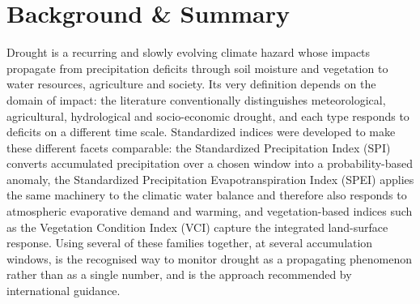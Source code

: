 \documentclass[10pt,a4paper]{article}
\begin{document}
\section*{Background \& Summary}
Drought is a recurring and slowly evolving climate hazard whose impacts propagate from precipitation deficits through soil moisture and vegetation to water resources, agriculture and society. Its very definition depends on the domain of impact: the literature conventionally distinguishes meteorological, agricultural, hydrological and socio-economic drought, and each type responds to deficits on a different time scale\citep{WilhiteGlantz1985,MishraSingh2010}. Standardized indices were developed to make these different facets comparable: the Standardized Precipitation Index (SPI) converts accumulated precipitation over a chosen window into a probability-based anomaly\citep{McKee1993}, the Standardized Precipitation Evapotranspiration Index (SPEI) applies the same machinery to the climatic water balance and therefore also responds to atmospheric evaporative demand and warming\citep{VicenteSerrano2010}, and vegetation-based indices such as the Vegetation Condition Index (VCI) capture the integrated land-surface response\citep{Kogan1995}. Using several of these families together, at several accumulation windows, is the recognised way to monitor drought as a propagating phenomenon rather than as a single number, and is the approach recommended by international guidance\citep{WMOLincoln2009,SvobodaFuchs2016}.
\end{document}
